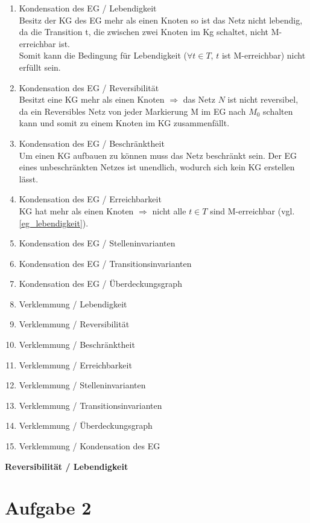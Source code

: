 \documentclass[10pt]{scrartcl}
\begin{document}
\begin{enumerate}
\item{Kondensation des EG / Lebendigkeit}\\
\label{eg_lebendigkeit}
Besitz der KG des EG mehr als einen Knoten so ist das Netz nicht lebendig, da die Transition t, die zwischen zwei Knoten im Kg schaltet, nicht M-erreichbar ist.\\
Somit kann die Bedingung für Lebendigkeit ($\forall t \in T$, $t$ ist M-erreichbar) nicht erfüllt sein.

\item{Kondensation des EG  / Reversibilität}\\
Besitzt eine KG mehr als einen Knoten $\Rightarrow$ das Netz $N$ ist nicht reversibel, da ein Reversibles Netz von jeder Markierung M im EG nach $M_{0}$ schalten kann und somit zu einem Knoten im KG zusammenfällt. 

\item{Kondensation des EG  / Beschränktheit}\\
Um einen KG aufbauen zu können muss das Netz beschränkt sein. 
Der EG eines unbeschränkten Netzes ist unendlich, wodurch sich kein KG erstellen lässt. 

\item{Kondensation des EG  / Erreichbarkeit}\\
KG hat mehr als einen Knoten $\Rightarrow$ nicht alle $t \in T$ sind M-erreichbar (vgl. \ref{eg_lebendigkeit}).

\item{Kondensation des EG  / Stelleninvarianten}\\

\item{Kondensation des EG  / Transitionsinvarianten}\\

\item{Kondensation des EG  / Überdeckungsgraph}\\

\item{Verklemmung / Lebendigkeit}\\

\item{Verklemmung / Reversibilität}\\

\item{Verklemmung / Beschränktheit}\\

\item{Verklemmung / Erreichbarkeit}\\

\item{Verklemmung / Stelleninvarianten}\\

\item{Verklemmung / Transitionsinvarianten}\\

\item{Verklemmung / Überdeckungsgraph}\\

\item{Verklemmung / Kondensation des EG}\\

\end{enumerate}
\textbf{Reversibilität / Lebendigkeit}


\section{Aufgabe 2}
\end{document}
